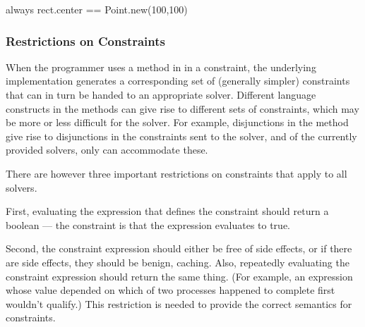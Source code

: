 \begin{code}[numbers=none]
always { rect.center == Point.new(100,100) }
\end{code}

\subsubsection{Restrictions on Constraints}
\label{sec:constraint-restrictions}
When the programmer uses a method in \langname in a constraint, the
underlying implementation generates a corresponding set of (generally
simpler) constraints that can in turn be handed to an appropriate
solver.  Different language constructs in the methods can give rise to
different sets of constraints, which may be more or less difficult for
the solver.  For example, disjunctions in the method
give rise to disjunctions in the constraints sent
to the solver, and of the currently provided solvers, only \zthree
can accommodate these.


There are however three important restrictions on constraints that
apply to all solvers.

First, evaluating the expression that defines the constraint should return a
boolean --- the constraint is that the expression evaluates to true.

Second, the constraint expression should either be free of side
effects, or if there are side effects, they should be benign,
\eg caching.  Also, repeatedly evaluating the constraint expression
should return the same thing.  (For example, an expression whose value
depended on which of two processes happened to complete first wouldn't
qualify.)  This restriction is needed to provide the correct semantics
for constraints.

